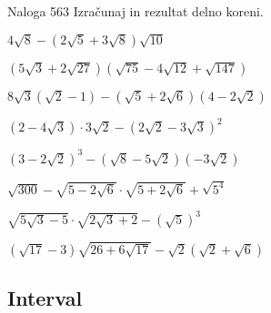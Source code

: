         \begin{frame}
            \begin{exampleblock}{Naloga 563}
                Izračunaj in rezultat delno koreni.
                \begin{description}
                    \item<2->[(b)] $\displaystyle 4\sqrt{8}-\left(2\sqrt{5}+3\sqrt{8}\right)\sqrt{10}$
                    \item<3->[(č)] $\displaystyle\left(5\sqrt{3}+2\sqrt{27}\right)\left(\sqrt{75}-4\sqrt{12}+\sqrt{147}\right)$
                    \item<4->[(g)] $\displaystyle 8\sqrt{3}\left(\sqrt{2}-1\right)-\left(\sqrt{5}+2\sqrt{6}\right)\left(4-2\sqrt{2}\right)$  
                    \item<5->[(j)] $\displaystyle\left(2-4\sqrt{3}\right)\cdot 3\sqrt{2}-\left(2\sqrt{2}-3\sqrt{3}\right)^2$
                    \item<6->[(l)] $\displaystyle\left(3-2\sqrt{2}\right)^3-\left(\sqrt{8}-5\sqrt{2}\right)\left(-3\sqrt{2}\right)$
                    \item<7->[(o)] $\displaystyle\sqrt{300}-\sqrt{5-2\sqrt{6}}\cdot\sqrt{5+2\sqrt{6}}+\sqrt{5^4}$
                    \item<8->[(r)] $\displaystyle\sqrt{5\sqrt{3}-5}\cdot\sqrt{2\sqrt{3}+2}-\left(\sqrt{5}\right)^3$  
                    \item<9->[(u)] $\displaystyle\left(\sqrt{17}-3\right)\sqrt{26+6\sqrt{17}}-\sqrt{2}\left(\sqrt{2}+\sqrt{6}\right)$
                \end{description}
            \end{exampleblock}
        \end{frame}

    \subsection{Interval}

